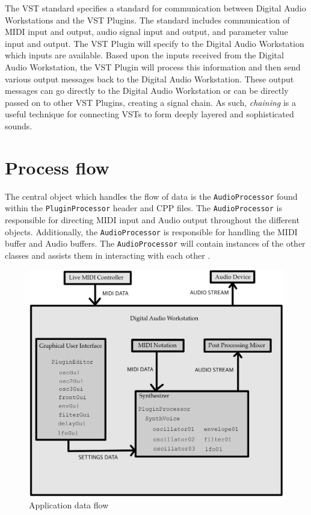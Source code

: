 \documentclass[a4paper,12pt]{report}
\begin{document}
The VST standard specifies a standard for communication between Digital Audio Workstations and the VST Plugins. The standard includes communication of MIDI input and output, audio signal input and output, and parameter value input and output. The VST Plugin will specify to the Digital Audio Workstation which inputs are available. Based upon the inputs received from the Digital Audio Workstation, the VST Plugin will process this information and then send various output messages back to the Digital Audio Workstation. These output messages can go directly to the Digital Audio Workstation or can be directly passed on to other VST Plugins, creating a signal chain. As such, \emph{chaining} is a useful technique for connecting VSTs to form deeply layered and sophisticated sounds.

\section{Process flow}
\label{sec:processflow}
The central object which handles the flow of data is the \texttt{Audio\-Processor} found within the \texttt{Plugin\-Processor} header and CPP files. The \texttt{Audio\-Processor} is responsible for directing MIDI input and Audio output throughout the different objects. Additionally, the \texttt{Audio\-Processor} is responsible for handling the MIDI buffer and Audio buffers. The \texttt{Audio\-Processor} will contain instances of the other classes and assists them in interacting with each other \cite{juceclassindex}.

\begin{figure}[h]
    \centering
    \includegraphics[width=36em]{Application Data Flow.jpeg}
    \caption{Application data flow}
    \label{fig:appdataflow}
\end{figure}
\end{document}

